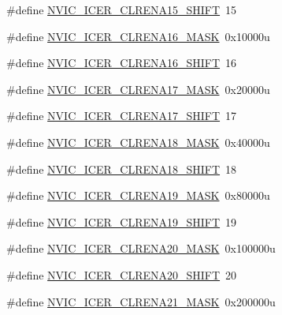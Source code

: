 \begin{DoxyCompactItemize}
\item 
\#define \hyperlink{group___n_v_i_c___register___masks_ga1a02d8fbd55a56b61d882763daadef56}{N\+V\+I\+C\+\_\+\+I\+C\+E\+R\+\_\+\+C\+L\+R\+E\+N\+A15\+\_\+\+S\+H\+I\+FT}~15
\item 
\#define \hyperlink{group___n_v_i_c___register___masks_ga8b7e4508bda83497b3fdc6fbf1dd5bf6}{N\+V\+I\+C\+\_\+\+I\+C\+E\+R\+\_\+\+C\+L\+R\+E\+N\+A16\+\_\+\+M\+A\+SK}~0x10000u
\item 
\#define \hyperlink{group___n_v_i_c___register___masks_gae317530c9facd1d0d632fdcdb45fa20b}{N\+V\+I\+C\+\_\+\+I\+C\+E\+R\+\_\+\+C\+L\+R\+E\+N\+A16\+\_\+\+S\+H\+I\+FT}~16
\item 
\#define \hyperlink{group___n_v_i_c___register___masks_gad608e6b4308ec1b247749e494a99014e}{N\+V\+I\+C\+\_\+\+I\+C\+E\+R\+\_\+\+C\+L\+R\+E\+N\+A17\+\_\+\+M\+A\+SK}~0x20000u
\item 
\#define \hyperlink{group___n_v_i_c___register___masks_ga4de9e2d8a383f4b5fc4990582f0dc1fa}{N\+V\+I\+C\+\_\+\+I\+C\+E\+R\+\_\+\+C\+L\+R\+E\+N\+A17\+\_\+\+S\+H\+I\+FT}~17
\item 
\#define \hyperlink{group___n_v_i_c___register___masks_gaa583d9bf9b8b93e4dbbad32ce32c92e0}{N\+V\+I\+C\+\_\+\+I\+C\+E\+R\+\_\+\+C\+L\+R\+E\+N\+A18\+\_\+\+M\+A\+SK}~0x40000u
\item 
\#define \hyperlink{group___n_v_i_c___register___masks_ga9c352361ae6c65c26bde4440e32853f0}{N\+V\+I\+C\+\_\+\+I\+C\+E\+R\+\_\+\+C\+L\+R\+E\+N\+A18\+\_\+\+S\+H\+I\+FT}~18
\item 
\#define \hyperlink{group___n_v_i_c___register___masks_gaca044790d0179eda05e5ecf3c706d5ee}{N\+V\+I\+C\+\_\+\+I\+C\+E\+R\+\_\+\+C\+L\+R\+E\+N\+A19\+\_\+\+M\+A\+SK}~0x80000u
\item 
\#define \hyperlink{group___n_v_i_c___register___masks_ga795bfb6e981dc235ad11f8a2125e10b8}{N\+V\+I\+C\+\_\+\+I\+C\+E\+R\+\_\+\+C\+L\+R\+E\+N\+A19\+\_\+\+S\+H\+I\+FT}~19
\item 
\#define \hyperlink{group___n_v_i_c___register___masks_ga9118f1b823782992b38111766fd5a6a8}{N\+V\+I\+C\+\_\+\+I\+C\+E\+R\+\_\+\+C\+L\+R\+E\+N\+A20\+\_\+\+M\+A\+SK}~0x100000u
\item 
\#define \hyperlink{group___n_v_i_c___register___masks_ga52696df7954aaccb65f76e2e0a2e5706}{N\+V\+I\+C\+\_\+\+I\+C\+E\+R\+\_\+\+C\+L\+R\+E\+N\+A20\+\_\+\+S\+H\+I\+FT}~20
\item 
\#define \hyperlink{group___n_v_i_c___register___masks_ga76914fdb4fb82900c8bf387b3981a0d4}{N\+V\+I\+C\+\_\+\+I\+C\+E\+R\+\_\+\+C\+L\+R\+E\+N\+A21\+\_\+\+M\+A\+SK}~0x200000u

\end{DoxyCompactItemize}
